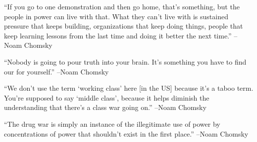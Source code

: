 \documentclass{article}%
\begin{document}
\linebreak%
\vspace{1mm}%
\begin{minipage}{\textwidth}%
\flushleft%
“If you go to one demonstration and then go home, that's something, but the people in power can live with that. What they can't live with is sustained pressure that keeps building, organizations that keep doing things, people that keep learning lessons from the last time and doing it better the next time.”%
\linebreak%
\vspace{1mm}%
–Noam Chomsky%
\linebreak%
\vspace{1mm}%
\end{minipage}%
\linebreak%
\vspace{1mm}%
\begin{minipage}{\textwidth}%
\flushleft%
“Nobody is going to pour truth into your brain. It's something you have to find our for yourself.”%
\linebreak%
\vspace{1mm}%
–Noam Chomsky%
\linebreak%
\vspace{1mm}%
\end{minipage}%
\linebreak%
\vspace{1mm}%
\begin{minipage}{\textwidth}%
\flushleft%
“We don't use the term ‘working class’ here {[}in the US{]} because it's a taboo term. You're supposed to say ‘middle class’, because it helps diminish the understanding that there's a class war going on.”%
\linebreak%
\vspace{1mm}%
–Noam Chomsky%
\linebreak%
\vspace{1mm}%
\end{minipage}%
\linebreak%
\vspace{1mm}%
\begin{minipage}{\textwidth}%
\flushleft%
“The drug war is simply an instance of the illegitimate use of power by concentrations of power that shouldn't exist in the first place.”%
\linebreak%
\vspace{1mm}%
–Noam Chomsky%
\linebreak%
\vspace{1mm}%
\end{minipage}%
\end{document}
